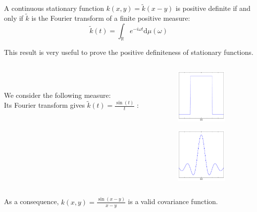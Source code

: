 \documentclass{beamer}
\begin{document}

\begin{frame}{}
\begin{theorem}[Bochner]
A continuous stationary function $k(x,y)=\tilde{k}(x-y)$ is positive definite if and only if $\tilde{k}$ is the Fourier transform of a finite positive measure:
\begin{equation*}
\tilde{k}(t) = \int_\mathds{R} e^{-i \omega t} \mathrm{d} \mu(\omega)
\end{equation*}
\end{theorem}
\vspace{5mm}
This result is very useful to prove the positive definiteness of stationary functions. 
\end{frame}

\begin{frame}{}
\begin{example}
\begin{columns}[c]
\begin{column}{7cm}
\ \\ \  \\
We consider the following measure:\\
\vspace{2.3cm}
Its Fourier transform gives $\tilde{k}(t) = \displaystyle \frac{\sin(t)}{t}$ :
\end{column}
\begin{column}{5cm}
\begin{center}
\includegraphics[width=2.5cm]{figures/python/Bochner-musinc}
\end{center}

\begin{center}
\includegraphics[width=2.5cm]{figures/python/Bochner-ksinc}
\end{center}
\end{column}
\end{columns} 
\vspace{2mm}
As a consequence, $\displaystyle k(x,y) = \frac{\sin(x-y)}{x-y}$
is a valid covariance function.
\end{example}

\end{frame}
\end{document}
